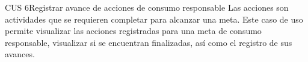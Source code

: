 \begin{UseCase}{CUS 6}{Registrar avance de acciones de consumo responsable}
    {
    Las acciones son actividades que se requieren completar para alcanzar una meta. Este caso de uso permite visualizar las acciones registradas para una meta de consumo responsable, visualizar si se encuentran finalizadas, así como el registro de sus avances. 
    }
    

    


\end{UseCase}
